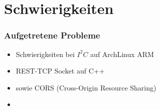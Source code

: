 \section{Schwierigkeiten}
\begin{frame}
    \frametitle{Aufgetretene Probleme}
	\begin{itemize}
        \item<1-> Schwierigkeiten bei $I^2C$ auf ArchLinux ARM
        \item<1-> REST-TCP Socket auf C++
        \item<1-> sowie CORS (Cross-Origin Resource Sharing)
        \item<2->
    \end{itemize}
\end{frame}